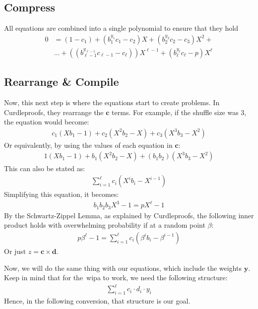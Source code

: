 \subsection{Compress}\label{subsec:compress}
All equations are combined into a single polynomial to ensure that they hold
\begin{align}
    0&=(1-c_1)+(b_{1}^{y_{1}}c_1-c_2)X+(b_{2}^{y_{2}}c_2-c_3)X^2+\\
    &\dots+((b_{\ell-1}^{y_{\ell-1}}c_{\ell-1}-c_\ell))X^{\ell-1}+(b_{\ell}^{y_{\ell}}c_{\ell}-p)X^{\ell}
\end{align}

\subsection{Rearrange \& Compile}\label{subsec:rearrange}
Now, this next step is where the equations start to create problems.
In Curdleproofs, they rearrange the $\mathbf{c}$ terms.
For example, if the shuffle size was 3, the equation would become:
\begin{align}
    c_1(Xb_1-1)+c_2(X^2b_2-X)+c_3(X^3b_3-X^2)
\end{align}
Or equivalently, by using the values of each equation in $\mathbf{c}$:
\begin{align}
    1(Xb_1-1)+b_1(X^2b_2-X)+(b_1b_2)(X^3b_3-X^2)
\end{align}
This can also be stated as:
\begin{align}
    \sum_{i=1}^{\ell}c_i(X^{i}b_{i}-X^{i-1})
\end{align}
Simplifying this equation, it becomes:
\begin{align}
    b_{1}b_{2}b_{3}X^3-1=pX^{\ell}-1
\end{align}
By the Schwartz-Zippel Lemma, as explained by Curdleproofs, the following inner product holds with overwhelming probability if at a random point $\beta$:
\begin{align}
    p\beta^{\ell}-1=\sum_{i=1}^{\ell}c_i(\beta^{i}b_i-\beta^{i-1})
\end{align}
Or just $z=\mathbf{c}\times\mathbf{d}$.

Now, we will do the same thing with our equations, which include the weights $\mathbf{y}$.
Keep in mind that for the~\gls{wipa} to work, we need the following structure:
\begin{align}\label{eq:structure}
    \sum_{i=1}^{\ell}c_i\cdot d_i\cdot y_i
\end{align}
Hence, in the following conversion, that structure is our goal.

